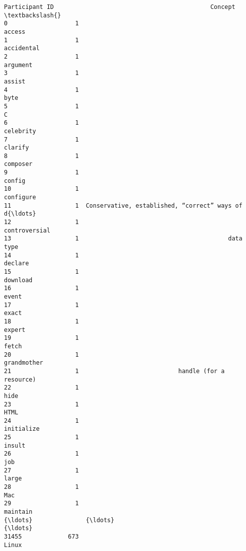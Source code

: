 \documentclass[11pt]{article}
\begin{document}
    \begin{Verbatim}[commandchars=\\\{\}]
       Participant ID                                            Concept  \textbackslash{}
0                   1                                             access   
1                   1                                         accidental   
2                   1                                           argument   
3                   1                                             assist   
4                   1                                               byte   
5                   1                                                  C   
6                   1                                          celebrity   
7                   1                                            clarify   
8                   1                                           composer   
9                   1                                             config   
10                  1                                          configure   
11                  1  Conservative, established, “correct” ways of d{\ldots}   
12                  1                                      controversial   
13                  1                                          data type   
14                  1                                            declare   
15                  1                                           download   
16                  1                                              event   
17                  1                                              exact   
18                  1                                             expert   
19                  1                                              fetch   
20                  1                                        grandmother   
21                  1                            handle (for a resource)   
22                  1                                               hide   
23                  1                                               HTML   
24                  1                                         initialize   
25                  1                                             insult   
26                  1                                                job   
27                  1                                              large   
28                  1                                                Mac   
29                  1                                           maintain   
{\ldots}               {\ldots}                                                {\ldots}   
31455             673                                              Linux   

\end{Verbatim}
\end{document}
